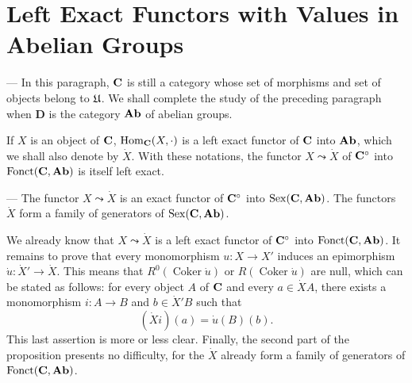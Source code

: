 %

\section{Left Exact Functors with Values in Abelian Groups}
--- In this paragraph, $\mathbf{C}$ is still a category whose set of morphisms and
set of objects belong to $\mathfrak{U}$. We shall complete the study of the
preceding paragraph when $\mathbf{D}$ is the category $\mathbf{Ab}$ of abelian groups.

If $X$ is an object of $\mathbf{C}$, $\operatorname{Hom}_{\mathbf{C}}(X,\cdot)$ is a left
exact functor of $\mathbf{C}$ into $\mathbf{Ab}$, which we shall also denote by $\dot{X}$.
With these notations, the functor $X\leadsto \dot{X}$ of $\mathbf{C}^{\circ}$
into $\operatorname{Fonct}(\mathbf{C},\mathbf{Ab})$ is itself left exact.

\begin{proposition}
--- The functor $X\leadsto \dot{X}$ is an exact functor of $\mathbf{C}^{\circ}$
into $\operatorname{Sex}(\mathbf{C},\mathbf{Ab})$. The functors $\dot{X}$ form a family of
generators of $\operatorname{Sex}(\mathbf{C},\mathbf{Ab})$.
\end{proposition}

We already know that $X\leadsto \dot{X}$ is a left exact functor of
$\mathbf{C}^{\circ}$ into $\operatorname{Fonct}(\mathbf{C},\mathbf{Ab})$. It remains to prove
that every monomorphism $u\colon X\to X'$ induces an epimorphism
$\dot{u}\colon \dot{X}'\to \dot{X}$. This means that
$R^{0}(\operatorname{Coker}\dot{u})$ or $R(\operatorname{Coker}\dot{u})$ are
null, which can be stated as follows: for every object $A$ of $\mathbf{C}$ and
every $a\in \dot{X}A$, there exists a monomorphism $i\colon A\to B$ and
$b\in \dot{X}'B$ such that
\[
  (\dot{X}i)(a) = \dot{u}(B)(b).
\]
This last assertion is more or less clear. Finally, the second part of the
proposition presents no difficulty, for the $\dot{X}$ already form a family
of generators of $\operatorname{Fonct}(\mathbf{C},\mathbf{Ab})$.


